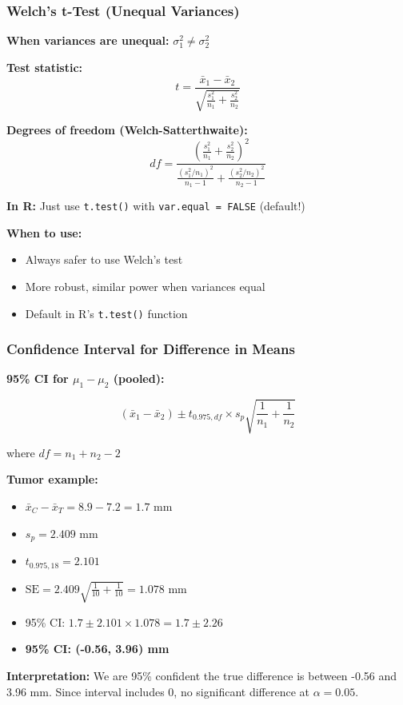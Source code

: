 \documentclass{beamer}
\begin{document}
\begin{frame}
\frametitle{Welch's t-Test (Unequal Variances)}
\textbf{When variances are unequal:} $\sigma_1^2 \neq \sigma_2^2$

\vspace{0.3cm}
\textbf{Test statistic:}
$$t = \frac{\bar{x}_1 - \bar{x}_2}{\sqrt{\frac{s_1^2}{n_1} + \frac{s_2^2}{n_2}}}$$

\vspace{0.3cm}
\textbf{Degrees of freedom (Welch-Satterthwaite):}
$$df = \frac{\left(\frac{s_1^2}{n_1} + \frac{s_2^2}{n_2}\right)^2}{\frac{(s_1^2/n_1)^2}{n_1-1} + \frac{(s_2^2/n_2)^2}{n_2-1}}$$

\vspace{0.3cm}
\textbf{In R:} Just use \texttt{t.test()} with \texttt{var.equal = FALSE} (default!)

\vspace{0.3cm}
\textbf{When to use:}
\begin{itemize}
\item Always safer to use Welch's test
\item More robust, similar power when variances equal
\item Default in R's \texttt{t.test()} function
\end{itemize}
\end{frame}

\begin{frame}
\frametitle{Confidence Interval for Difference in Means}
\textbf{95\% CI for $\mu_1 - \mu_2$ (pooled):}

$$(\bar{x}_1 - \bar{x}_2) \pm t_{0.975, df} \times s_p \sqrt{\frac{1}{n_1} + \frac{1}{n_2}}$$

where $df = n_1 + n_2 - 2$

\vspace{0.1cm}
\textbf{Tumor example:}
\begin{itemize}
\setlength\itemsep{-0.3em}
\item $\bar{x}_C - \bar{x}_T = 8.9 - 7.2 = 1.7$ mm
\item $s_p = 2.409$ mm
\item $t_{0.975, 18} = 2.101$
\item $\text{SE} = 2.409 \sqrt{\frac{1}{10} + \frac{1}{10}} = 1.078$ mm
\item 95\% CI: $1.7 \pm 2.101 \times 1.078 = 1.7 \pm 2.26$
\item \textbf{95\% CI: (-0.56, 3.96) mm}
\end{itemize}

\vspace{0.05cm}
\small
\textbf{Interpretation:} We are 95\% confident the true difference is between -0.56 and 3.96 mm. Since interval includes 0, no significant difference at $\alpha = 0.05$.
\end{frame}
\end{document}
